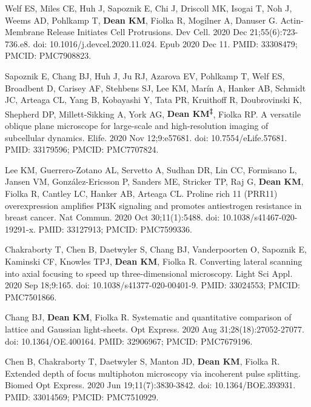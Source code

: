 \begin{etaremune}
\item Welf ES, Miles CE, Huh J, Sapoznik E, Chi J, Driscoll MK, Isogai T, Noh J, Weems AD, Pohlkamp T, \textbf{Dean KM}, Fiolka R, Mogilner A, Danuser G. Actin-Membrane Release Initiates Cell Protrusions. Dev Cell. 2020 Dec 21;55(6):723-736.e8. doi: 10.1016/j.devcel.2020.11.024. Epub 2020 Dec 11. PMID: 33308479; PMCID: PMC7908823.

\item  Sapoznik E, Chang BJ, Huh J, Ju RJ, Azarova EV, Pohlkamp T, Welf ES, Broadbent D, Carisey AF, Stehbens SJ, Lee KM, Mar\'{i}n A, Hanker AB, Schmidt JC, Arteaga CL, Yang B, Kobayashi Y, Tata PR, Kruithoff R, Doubrovinski K, Shepherd DP, Millett-Sikking A, York AG, \textbf{Dean KM\textsuperscript{‡}}, Fiolka RP. A versatile oblique plane microscope for large-scale and high-resolution imaging of subcellular dynamics. Elife. 2020 Nov 12;9:e57681. doi: 10.7554/eLife.57681. PMID: 33179596; PMCID: PMC7707824.

\item Lee KM, Guerrero-Zotano AL, Servetto A, Sudhan DR, Lin CC, Formisano L, Jansen VM, Gonz\'{a}lez-Ericsson P, Sanders ME, Stricker TP, Raj G, \textbf{Dean KM}, Fiolka R, Cantley LC, Hanker AB, Arteaga CL. Proline rich 11 (PRR11) overexpression amplifies PI3K signaling and promotes antiestrogen resistance in breast cancer. Nat Commun. 2020 Oct 30;11(1):5488. doi: 10.1038/s41467-020-19291-x. PMID: 33127913; PMCID: PMC7599336.

\item Chakraborty T, Chen B, Daetwyler S, Chang BJ, Vanderpoorten O, Sapoznik E, Kaminski CF, Knowles TPJ, \textbf{Dean KM}, Fiolka R. Converting lateral scanning into axial focusing to speed up three-dimensional microscopy. Light Sci Appl. 2020 Sep 18;9:165. doi: 10.1038/s41377-020-00401-9. PMID: 33024553; PMCID: PMC7501866.

\item Chang BJ, \textbf{Dean KM}, Fiolka R. Systematic and quantitative comparison of lattice and Gaussian light-sheets. Opt Express. 2020 Aug 31;28(18):27052-27077. doi: 10.1364/OE.400164. PMID: 32906967; PMCID: PMC7679196.

\item Chen B, Chakraborty T, Daetwyler S, Manton JD, \textbf{Dean KM}, Fiolka R. Extended depth of focus multiphoton microscopy via incoherent pulse splitting. Biomed Opt Express. 2020 Jun 19;11(7):3830-3842. doi: 10.1364/BOE.393931. PMID: 33014569; PMCID: PMC7510929.


\end{etaremune}
